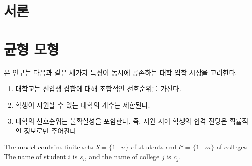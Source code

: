 \documentclass[12pt]{article} %
\author{Max Kapur}
\date{\today}                %
\newif\ifEN
\theoremstyle{definition}
\theoremstyle{definition}
\begin{document}
\maketitle
\pagebreak

\tableofcontents
\pagebreak

\ifEN \section{Introduction}  \else \section{서론} \fi

\ifEN \section{Equilibrium model}  \else \section{균형 모형} \fi
\ifEN {
This study considers the efficiency of a college admissions market in which the following three features coincide:
\begin{enumerate}
\item \label{feat-combipref} Colleges have \emph{combinatorial} preferences over the composition of their entering class. 
\item \label{feat-uncertainty}There is \emph{uncertainty} in colleges’ preferences; that is, students have only probabilistic information about their admissions prospects at the time of application.
\item \label{feat-constrainedapp} Students are \emph{constrained} in the number of schools to which they can apply.  
\end{enumerate}
} \else {
본 연구는 다음과 같은 세가지 특징이 동시에 공존하는 대학 입학 시장을 고려한다.
\begin{enumerate}
\item 대학교는 신입생 집합에 대해 조합적인 선호순위를 가진다.
\item 학생이 지원할 수 있는 대학의 개수는 제한된다.
\item 대학의 선호순위는 불확실성을 포함한다. 즉, 지원 시에 학생의 합격 전망은 확률적인 정보로만 주어진다.
\end{enumerate}
} \fi
The model contains finite sets $\mathcal{S} = \{1 \dots n\}$ of students and $\mathcal{C} = \{1 \dots m\}$ of colleges. The name of student $i$ is $s_i$, and the name of college $j$ is $c_j$. 
\end{document}
